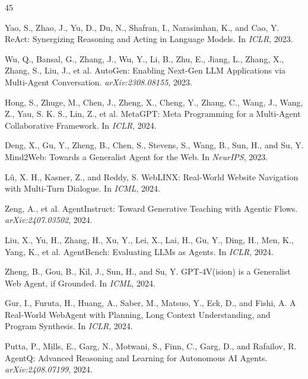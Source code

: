 \documentclass{article}
\begin{document}

\begin{thebibliography}{45}

 Yao, S., Zhao, J., Yu, D., Du, N., Shafran, I., Narasimhan, K., and Cao, Y. ReAct: Synergizing Reasoning and Acting in Language Models. In \emph{ICLR}, 2023.

 Wu, Q., Bansal, G., Zhang, J., Wu, Y., Li, B., Zhu, E., Jiang, L., Zhang, X., Zhang, S., Liu, J., et al. AutoGen: Enabling Next-Gen LLM Applications via Multi-Agent Conversation. \emph{arXiv:2308.08155}, 2023.

 Hong, S., Zhuge, M., Chen, J., Zheng, X., Cheng, Y., Zhang, C., Wang, J., Wang, Z., Yau, S. K. S., Lin, Z., et al. MetaGPT: Meta Programming for a Multi-Agent Collaborative Framework. In \emph{ICLR}, 2024.

 Deng, X., Gu, Y., Zheng, B., Chen, S., Stevens, S., Wang, B., Sun, H., and Su, Y. Mind2Web: Towards a Generalist Agent for the Web. In \emph{NeurIPS}, 2023.

 L\^{u}, X. H., Kasner, Z., and Reddy, S. WebLINX: Real-World Website Navigation with Multi-Turn Dialogue. In \emph{ICML}, 2024.

 Zeng, A., et al. AgentInstruct: Toward Generative Teaching with Agentic Flows. \emph{arXiv:2407.03502}, 2024.

 Liu, X., Yu, H., Zhang, H., Xu, Y., Lei, X., Lai, H., Gu, Y., Ding, H., Men, K., Yang, K., et al. AgentBench: Evaluating LLMs as Agents. In \emph{ICLR}, 2024.

 Zheng, B., Gou, B., Kil, J., Sun, H., and Su, Y. GPT-4V(ision) is a Generalist Web Agent, if Grounded. In \emph{ICML}, 2024.

 Gur, I., Furuta, H., Huang, A., Saber, M., Matsuo, Y., Eck, D., and Fishi, A. A Real-World WebAgent with Planning, Long Context Understanding, and Program Synthesis. In \emph{ICLR}, 2024.

 Putta, P., Mills, E., Garg, N., Motwani, S., Finn, C., Garg, D., and Rafailov, R. AgentQ: Advanced Reasoning and Learning for Autonomous AI Agents. \emph{arXiv:2408.07199}, 2024.


\end{thebibliography}
\end{document}
